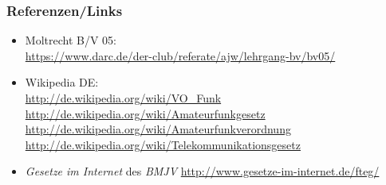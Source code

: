 \begin{frame}
  \frametitle{Referenzen/Links}

  \footnotesize
  \begin{itemize}
    \item Moltrecht B/V 05: \\
      \url{https://www.darc.de/der-club/referate/ajw/lehrgang-bv/bv05/}
    \item Wikipedia DE: \\
      \url{http://de.wikipedia.org/wiki/VO\_Funk} \\
      \url{http://de.wikipedia.org/wiki/Amateurfunkgesetz}
      \url{http://de.wikipedia.org/wiki/Amateurfunkverordnung}
      \url{http://de.wikipedia.org/wiki/Telekommunikationsgesetz}
    \item \emph{Gesetze im Internet} des \emph{BMJV}
      \url{http://www.gesetze-im-internet.de/fteg/}
  \end{itemize}

\end{frame}


